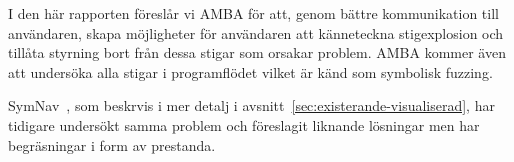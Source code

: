 I den här rapporten föreslår vi AMBA för att, genom bättre kommunikation till användaren, skapa möjligheter för användaren att känneteckna stigexplosion och tillåta styrning bort från dessa stigar som orsakar problem. AMBA kommer även att undersöka alla stigar i programflödet vilket är känd som symbolisk fuzzing.

SymNav~\cite{symnav}, som beskrvis i mer detalj i avsnitt~\ref{sec:existerande-visualiserad}, har tidigare undersökt samma problem och föreslagit liknande lösningar men har begräsningar i form av prestanda.